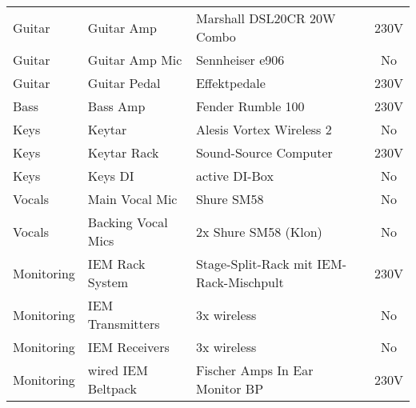 {\begin{center}
\begin{tabular}{|l|l|p{4cm}|c|}
            \rowcolor{guitarcolor} Guitar         & Guitar Amp                  & Marshall DSL20CR 20W Combo                          & 230V                    \\
            \rowcolor{guitarcolor} Guitar         & Guitar Amp Mic              & Sennheiser e906                                     & No                      \\
            \rowcolor{guitarcolor} Guitar         & Guitar Pedal                & Effektpedale                                        & 230V                    \\

            \rowcolor{basscolor} Bass             & Bass Amp                    & Fender Rumble 100                                   & 230V                    \\

            \rowcolor{keyscolor} Keys             & Keytar                      & Alesis Vortex Wireless 2                            & No                      \\
            \rowcolor{keyscolor} Keys             & Keytar Rack                 & Sound-Source Computer                               & 230V                    \\
            \rowcolor{keyscolor} Keys             & Keys DI                     & active DI-Box                                       & No                      \\

            \rowcolor{vocalscolor} Vocals         & Main Vocal Mic              & Shure SM58                                          & No                      \\
            \rowcolor{vocalscolor} Vocals         & Backing Vocal Mics          & 2x Shure SM58 (Klon)                                & No                      \\

            \rowcolor{monitoringcolor} Monitoring & IEM Rack System             & Stage-Split-Rack mit IEM-Rack-Mischpult             & 230V                    \\
            \rowcolor{monitoringcolor} Monitoring & IEM Transmitters            & 3x wireless                                         & No                      \\
            \rowcolor{monitoringcolor} Monitoring & IEM Receivers               & 3x wireless                                         & No                      \\
            \rowcolor{monitoringcolor} Monitoring & wired IEM Beltpack          & Fischer Amps In Ear Monitor BP                      & 230V                    \\


\end{tabular}
\end{center}}
